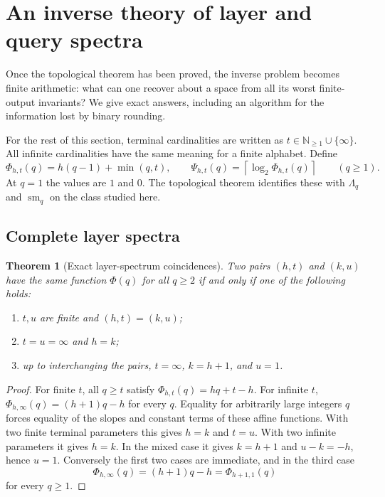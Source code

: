 \documentclass[11pt,letterpaper]{article}
\numberwithin{equation}{section}
\newtheorem{theorem}{Theorem}[section]
\theoremstyle{definition}
\theoremstyle{remark}
\theoremstyle{definition}
\newcommand{\ceil}[1]{\left\lceil#1\right\rceil}
\newcommand{\N}{\mathbb N}
\newcommand{\smq}{\operatorname{sm}_{q}}
\begin{document}
\section{An inverse theory of layer and query spectra}\label{uw:sec:inverse}

Once the topological theorem has been proved, the inverse problem becomes
finite arithmetic: what can one recover about a space from all its worst
finite-output invariants? We give exact answers, including an algorithm for
the information lost by binary rounding.

For the rest of this section, terminal cardinalities are written as
$t\in\N_{\ge1}\cup\{\infty\}$. All infinite cardinalities have the same
meaning for a finite alphabet. Define
\begin{equation}\label{uw:eq:arithmetic-spectrum}
 \Phi_{h,t}(q)=h(q-1)+\min(q,t),\qquad
 \Psi_{h,t}(q)=\ceil{\log_2\Phi_{h,t}(q)}\qquad(q\ge1).
\end{equation}
At $q=1$ the values are $1$ and $0$. The topological theorem identifies these
with $\Lambda_q$ and $\smq$ on the class studied here.

\subsection{Complete layer spectra}
\begin{theorem}[Exact layer-spectrum coincidences]\label{uw:thm:layer-inverse}
Two pairs $(h,t)$ and $(k,u)$ have the same function $\Phi(q)$ for all $q\ge2$
if and only if one of the following holds:
\begin{enumerate}[label=\textup{(\roman*)}]
\item $t,u$ are finite and $(h,t)=(k,u)$;
\item $t=u=\infty$ and $h=k$;
\item up to interchanging the pairs, $t=\infty$, $k=h+1$, and $u=1$.
\end{enumerate}
\end{theorem}
\begin{proof}
For finite $t$, all $q\ge t$ satisfy
$\Phi_{h,t}(q)=hq+t-h$. For infinite $t$,
$\Phi_{h,\infty}(q)=(h+1)q-h$ for every $q$. Equality for arbitrarily large
integers $q$ forces equality of the slopes and constant terms of these
affine functions. With two finite terminal parameters this gives $h=k$ and
$t=u$. With two infinite parameters it gives $h=k$. In the mixed case it
gives $k=h+1$ and $u-k=-h$, hence $u=1$. Conversely the first two cases are
immediate, and in the third case
\[
 \Phi_{h,\infty}(q)=(h+1)q-h=\Phi_{h+1,1}(q)
\]
for every $q\ge1$.
\end{proof}
\end{document}
